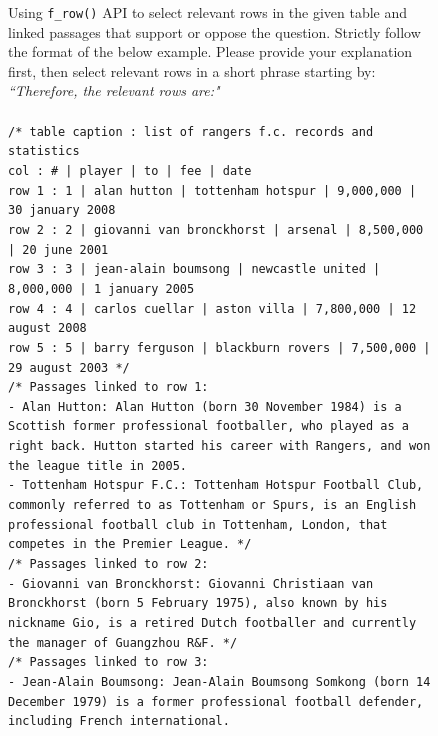 \begin{figure}[htb]

\begin{tcolorbox}
[title = Column-wise Aggregation, colback = gray!10, colframe = black, sharp corners, boxrule=0.5mm]

Using \texttt{f\_row()} API to select relevant rows in the given table and linked passages that support or oppose the question. 
Strictly follow the format of the below example. Please provide your explanation first, then select relevant rows in a short phrase starting by: \textit{``Therefore, the relevant rows are:"}
\\
\\
\texttt{/* 
table caption : list of rangers f.c. records and statistics \\
col : \# | player | to | fee | date \\
row 1 : 1 | alan hutton | tottenham hotspur | 9,000,000 | 30 january 2008 \\
row 2 : 2 | giovanni van bronckhorst | arsenal | 8,500,000 | 20 june 2001 \\
row 3 : 3 | jean-alain boumsong | newcastle united | 8,000,000 | 1 january 2005 \\
row 4 : 4 | carlos cuellar | aston villa | 7,800,000 | 12 august 2008 \\
row 5 : 5 | barry ferguson | blackburn rovers | 7,500,000 | 29 august 2003 
*/}
 \\
\texttt{/* 
Passages linked to row 1: \\
- Alan Hutton: Alan Hutton (born 30 November 1984) is a Scottish former professional footballer, who played as a right back. Hutton started his career with Rangers, and won the league title in 2005. \\
- Tottenham Hotspur F.C.: Tottenham Hotspur Football Club, commonly referred to as Tottenham or Spurs, is an English professional football club in Tottenham, London, that competes in the Premier League.
*/}
 \\
\texttt{/* 
Passages linked to row 2: \\
- Giovanni van Bronckhorst: Giovanni Christiaan van Bronckhorst (born 5 February 1975), also known by his nickname Gio, is a retired Dutch footballer and currently the manager of Guangzhou R\&F. 
*/}
 \\
\texttt{/* 
Passages linked to row 3: \\
- Jean-Alain Boumsong: Jean-Alain Boumsong Somkong (born 14 December 1979) is a former professional football defender, including French international.  \\
}
\end{tcolorbox}
\end{figure}
